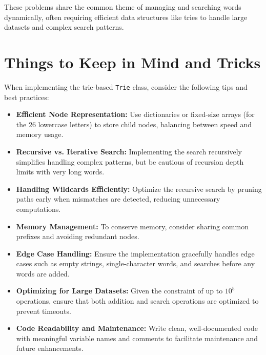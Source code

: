 These problems share the common theme of managing and searching words dynamically, often requiring efficient data structures like tries to handle large datasets and complex search patterns.

\section*{Things to Keep in Mind and Tricks}

When implementing the trie-based \texttt{Trie} class, consider the following tips and best practices:

\begin{itemize}
    \item \textbf{Efficient Node Representation:}  
    Use dictionaries or fixed-size arrays (for the 26 lowercase letters) to store child nodes, balancing between speed and memory usage.
    
    \item \textbf{Recursive vs. Iterative Search:}  
    Implementing the search recursively simplifies handling complex patterns, but be cautious of recursion depth limits with very long words.
    
    \item \textbf{Handling Wildcards Efficiently:}  
    Optimize the recursive search by pruning paths early when mismatches are detected, reducing unnecessary computations.
    
    \item \textbf{Memory Management:}  
    To conserve memory, consider sharing common prefixes and avoiding redundant nodes.
    
    \item \textbf{Edge Case Handling:}  
    Ensure the implementation gracefully handles edge cases such as empty strings, single-character words, and searches before any words are added.
    
    \item \textbf{Optimizing for Large Datasets:}  
    Given the constraint of up to \(10^5\) operations, ensure that both addition and search operations are optimized to prevent timeouts.
    
    \item \textbf{Code Readability and Maintenance:}  
    Write clean, well-documented code with meaningful variable names and comments to facilitate maintenance and future enhancements.
\end{itemize}


